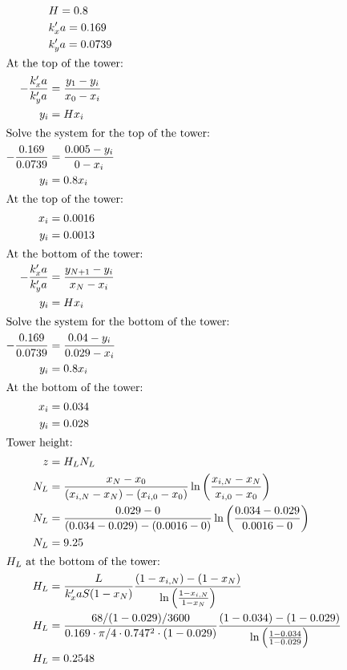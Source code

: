 \documentclass[12pt]{article}
\begin{document}
\begin{enumerate}
\begin{enumerate}
        \begin{align*}
            & H = 0.8 \\
            & k_x'a = 0.169 \\
            & k_y'a = 0.0739 \\
            \intertext{At the top of the tower:}
            -\frac{k_x'a}{k_y'a} &= \frac{y_1 - y_i}{x_0 - x_i} \\
            y_i &= H x_i \\
            \intertext{Solve the system for the top of the tower:}
            -\frac{0.169}{0.0739} &= \frac{0.005 - y_i}{0 - x_i} \\
            y_i &= 0.8 x_i \\
            \intertext{At the top of the tower:}
            x_i &= 0.0016 \\
            y_i &= 0.0013 \\
            \intertext{At the bottom of the tower:}
            -\frac{k_x'a}{k_y'a} &= \frac{y_{N+1} - y_i}{x_N - x_i} \\
            y_i &= H x_i \\
            \intertext{Solve the system for the bottom of the tower:}
            -\frac{0.169}{0.0739} &= \frac{0.04 - y_i}{0.029 - x_i} \\
            y_i &= 0.8 x_i \\
            \intertext{At the bottom of the tower:}
            x_i &= 0.034 \\
            y_i &= 0.028 \\
            \intertext{Tower height:}
            z &= H_L N_L \\
            N_L &= \frac{x_N - x_0}{(x_{i,N} - x_N) - (x_{i,0} - x_0)} \ln\left(\frac{x_{i,N} - x_N}{x_{i,0} - x_0}\right) \\
            N_L &= \frac{0.029 - 0}{(0.034 - 0.029) - (0.0016 - 0)} \ln\left(\frac{0.034 - 0.029}{0.0016 - 0}\right) \\
            N_L &= 9.25 \\
            \intertext{$H_L$ at the bottom of the tower:}
            H_L &= \frac{L}{k_x'a S (1 - x_N)} \frac{(1 - x_{i,N}) - (1 - x_N)}{\ln\left(\frac{1 - x_{i,N}}{1 - x_N}\right)} \\
            H_L &= \frac{68 / (1 - 0.029) / 3600}{0.169 \cdot \pi/4 \cdot 0.747^2 \cdot (1 - 0.029)} \frac{(1 - 0.034) - (1 - 0.029)}{\ln\left(\frac{1 - 0.034}{1 - 0.029}\right)} \\
            H_L &= 0.2548 \\

\end{align*}
\end{enumerate}
\end{enumerate}
\end{document}
